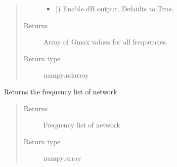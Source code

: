 \documentclass[letterpaper,10pt,english]{sphinxmanual}
\begin{document}
\begin{fulllineitems}
\begin{fulllineitems}
\begin{quote}
\begin{description}
\begin{itemize}
\item {} 
 (\sphinxstyleliteralemphasis{\sphinxupquote{, }}) \textendash{} Enable dB output. Defaults to True.

\end{itemize}

\item[{Returns}] \leavevmode
Array of Gmax values for all frequencies

\item[{Return type}] \leavevmode
numpy.ndarray

\end{description}\end{quote}

\end{fulllineitems}


\begin{fulllineitems}
\label{\detokenize{touchstone:touchstone.spfile.get_formulation}}
\end{fulllineitems}


\begin{fulllineitems}
\label{\detokenize{touchstone:touchstone.spfile.get_frequency_list}}
Returns the frequency list of network
\begin{quote}\begin{description}
\item[{Returns}] \leavevmode
Frequency list of network

\item[{Return type}] \leavevmode
numpy.array

\end{description}\end{quote}

\end{fulllineitems}



\end{fulllineitems}
\end{document}
